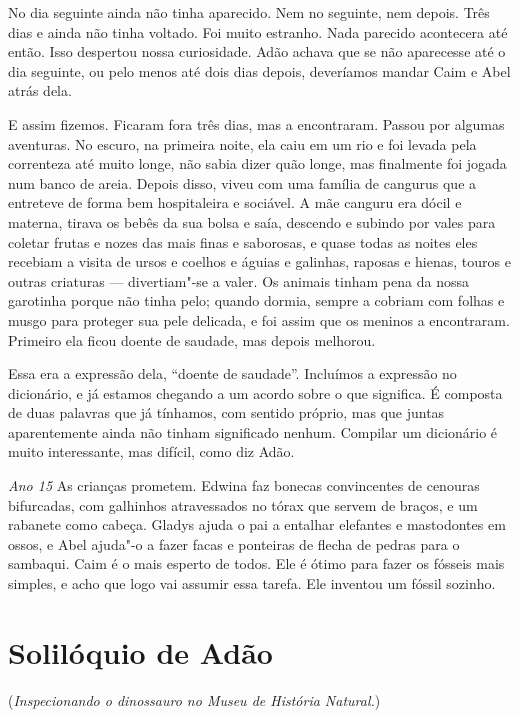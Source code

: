 No dia seguinte ainda não tinha aparecido. Nem no seguinte, nem depois.
Três dias e ainda não tinha voltado. Foi muito estranho. Nada parecido
acontecera até então. Isso despertou nossa curiosidade. Adão achava
que se não aparecesse até o dia seguinte, ou pelo menos até dois dias depois,     
deveríamos mandar Caim e Abel atrás dela.

E assim fizemos. Ficaram fora três dias, mas a encontraram. Passou por algumas
aventuras. No escuro, na primeira noite, ela caiu em um rio e foi levada pela
correnteza até muito longe, não sabia dizer quão longe, mas finalmente foi
jogada num banco de areia. Depois disso, viveu com uma família de cangurus
que a entreteve de forma bem hospitaleira e sociável. A mãe canguru
era dócil e materna, tirava os bebês da sua bolsa e saía, descendo e subindo
por vales para coletar frutas e nozes das mais finas e saborosas, e quase todas
as noites eles recebiam a visita de ursos e coelhos e águias e galinhas, raposas e
hienas, touros e outras criaturas --- divertiam"-se a valer. Os animais tinham
pena da nossa garotinha porque não tinha pelo; quando dormia, sempre a cobriam
com folhas e musgo para proteger sua pele delicada, e foi assim que os
meninos a encontraram. Primeiro ela ficou doente de saudade, mas depois
melhorou.

Essa era a expressão dela, “doente de saudade”. Incluímos a expressão no dicionário, e
já estamos chegando a um acordo sobre o que significa. É composta de duas palavras
que já tínhamos, com sentido próprio, mas que juntas aparentemente ainda não
tinham significado nenhum. Compilar um dicionário é muito interessante,
mas difícil, como diz Adão.

\textit{Ano 15} As crianças prometem. Edwina faz bonecas convincentes de cenouras
bifurcadas, com galhinhos atravessados no tórax que servem de braços, e um
rabanete como cabeça. Gladys ajuda o pai a entalhar elefantes e mastodontes em
ossos, e Abel ajuda"-o a fazer facas e ponteiras de flecha de pedras para o 
sambaqui. Caim é o mais esperto de todos. Ele é ótimo para fazer os 
fósseis mais simples, e acho que logo vai assumir essa tarefa. Ele inventou um 
fóssil sozinho.

\chapter{Solilóquio de Adão}
\medskip


\sectionitem

\noindent (\textit{Inspecionando o dinossauro no Museu de História Natural.})

